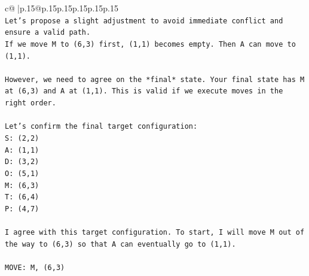 \documentclass{article}
\begin{document}
{\begin{supertabular}{c@{$\;$}|p{.15\linewidth}@{}p{.15\linewidth}p{.15\linewidth}p{.15\linewidth}p{.15\linewidth}p{.15\linewidth}}
{{{\\ 
\texttt{Let's propose a slight adjustment to avoid immediate conflict and ensure a valid path.} \\
\texttt{If we move M to (6,3) first, (1,1) becomes empty. Then A can move to (1,1).} \\
\\ 
\texttt{However, we need to agree on the *final* state. Your final state has M at (6,3) and A at (1,1). This is valid if we execute moves in the right order.} \\
\\ 
\texttt{Let's confirm the final target configuration:} \\
\texttt{S: (2,2)} \\
\texttt{A: (1,1)} \\
\texttt{D: (3,2)} \\
\texttt{O: (5,1)} \\
\texttt{M: (6,3)} \\
\texttt{T: (6,4)} \\
\texttt{P: (4,7)} \\
\\ 
\texttt{I agree with this target configuration. To start, I will move M out of the way to (6,3) so that A can eventually go to (1,1).} \\
\\ 
\texttt{MOVE: M, (6,3)} \\
            }
        }
    }
     \\ \\


\end{supertabular}}
\end{document}
